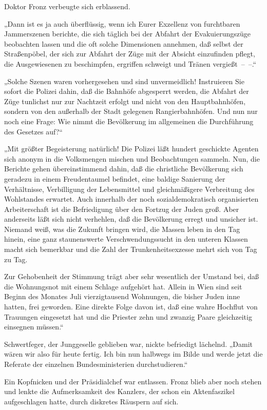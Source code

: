 Doktor Fronz verbeugte sich erblassend.

„Dann ist es ja auch überflüssig, wenn ich Eurer Exzellenz von
furchtbaren Jammerszenen berichte, die sich täglich bei der Abfahrt
der Evakuierungszüge beobachten lassen und die oft solche
Dimensionen annehmen, daß selbst der Straßenpöbel, der sich zur
Abfahrt der Züge mit der Absicht einzufinden pflegt, die
Ausgewiesenen zu beschimpfen, ergriffen schweigt und Tränen
vergießt~–~–.“

„Solche Szenen waren vorhergesehen und sind unvermeidlich!
Instruieren Sie sofort die Polizei dahin, daß die Bahnhöfe
abgesperrt werden, die Abfahrt der Züge tunlichst nur zur Nachtzeit
erfolgt und nicht von den Hauptbahnhöfen, sondern von den außerhalb
der Stadt gelegenen Rangierbahnhöfen. Und nun nur noch eine Frage:
Wie nimmt die Bevölkerung im allgemeinen die Durchführung des
Gesetzes auf?“

„Mit größter Begeisterung natürlich! Die Polizei läßt hundert
geschickte Agenten sich anonym in die Volksmengen mischen und
Beobachtungen sammeln. Nun, die Berichte  gehen
übereinstimmend dahin, daß die christliche Bevölkerung sich
geradezu in einem Freudentaumel befindet, eine baldige Sanierung
der Verhältnisse, Verbilligung der Lebensmittel und gleichmäßigere
Verbreitung des Wohlstandes erwartet. Auch innerhalb der noch
sozialdemokratisch organisierten Arbeiterschaft ist die
Befriedigung über den Fortzug der Juden groß. Aber anderseits läßt
sich nicht verhehlen, daß die Bevölkerung erregt und unsicher ist.
Niemand weiß, was die Zukunft bringen wird, die Massen leben in den
Tag hinein, eine ganz staunenswerte Verschwendungssucht in den
unteren Klassen macht sich bemerkbar und die Zahl der
Trunkenheitsexzesse mehrt sich von Tag zu Tag.

Zur Gehobenheit der Stimmung trägt aber sehr wesentlich der Umstand
bei, daß die Wohnungsnot mit einem Schlage aufgehört hat. Allein in
Wien sind seit Beginn des Monates Juli vierzigtausend Wohnungen,
die bisher Juden inne hatten, frei geworden. Eine direkte Folge
davon ist, daß eine wahre Hochflut von Trauungen eingesetzt hat und
die Priester zehn und zwanzig Paare gleichzeitig einsegnen
müssen.“

Schwertfeger, der Junggeselle geblieben war, nickte befriedigt
lächelnd. „Damit wären wir also für heute fertig. Ich bin nun
halbwegs im Bilde und werde jetzt die Referate der einzelnen
Bundesministerien durchstudieren.“

Ein Kopfnicken und der Präsidialchef war entlassen. Fronz blieb
aber noch stehen und lenkte die Aufmerksamkeit  des
Kanzlers, der schon ein Aktenfaszikel aufgeschlagen hatte, durch
diskretes Räuspern auf sich.

